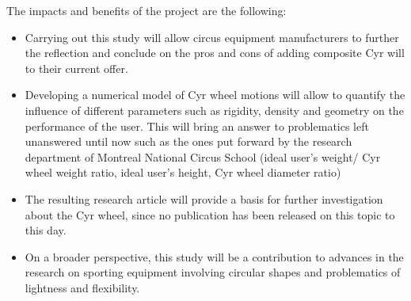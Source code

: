 The impacts and benefits of the project are the following:
\begin{itemize}
\item Carrying out this study will allow circus equipment manufacturers to further the reflection and conclude on the pros and cons of adding composite Cyr will to their current offer.
\item Developing a numerical model of Cyr wheel motions will allow to quantify the influence of different parameters such as rigidity, density and geometry on the performance of the user. This will bring an answer to problematics left unanswered until now such as the ones put forward by the research department of Montreal National Circus School (ideal user’s weight/ Cyr wheel weight ratio, ideal user’s height, Cyr wheel diameter ratio) 
\item The resulting research article will provide a basis for further investigation about the Cyr wheel, since no publication has been released on this topic to this day.
\item On a broader perspective, this study will be a contribution to advances in the research on sporting equipment involving circular shapes and problematics of lightness and flexibility.

\end{itemize}
